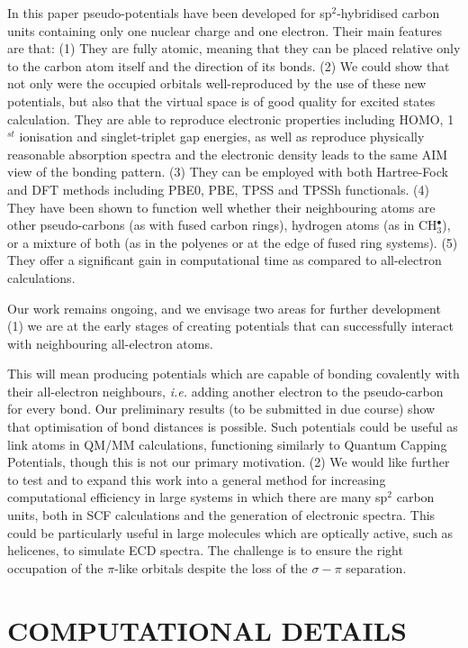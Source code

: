 \documentclass[12pt]{article}
\begin{document}
In this paper pseudo-potentials have been developed for sp$^{2}$-hybridised carbon units containing only one nuclear charge and one electron. 
Their main features are that: 
(1) They are fully atomic, meaning that they can be placed relative only to the carbon atom itself and the direction of its bonds. 
(2) We could show that not only were the occupied orbitals well-reproduced by the use of these new potentials, but also that the virtual space is of good quality for excited states calculation. 
They are able to reproduce electronic properties including HOMO, 1$^{st}$ ionisation and singlet-triplet gap energies, as well as reproduce physically reasonable absorption spectra and the electronic
density leads to the same AIM view of the bonding pattern.
(3) They can be employed with both Hartree-Fock and DFT methods including PBE0, PBE, TPSS and TPSSh functionals. 
(4) They have been shown to function well whether their neighbouring atoms are other pseudo-carbons (as with fused carbon rings), hydrogen atoms (as in CH\(^{\bullet}_{3}\)),
or a mixture of both (as in the polyenes or at the edge of fused ring systems). 
(5) They offer a significant gain in computational time as compared to all-electron calculations.

Our work remains ongoing, and we envisage two areas for further development
(1) we are at the early stages of creating potentials that can successfully interact with neighbouring all-electron atoms.

This will mean producing potentials which are capable of bonding covalently with their all-electron neighbours, \textsl{i.e.} adding another electron to the pseudo-carbon for every bond.
Our preliminary results (to be submitted in due course) show that optimisation of bond distances is possible.
Such potentials could be useful as link atoms in QM/MM calculations, functioning similarly to Quantum Capping Potentials,\cite{dilabio_simple_2002} though this is not our primary motivation.
(2) We would like further to test and to expand this work into a general method for increasing computational efficiency in large systems in
which there are many sp$^{2}$ carbon units, both in SCF calculations and the generation of electronic spectra.
This could be particularly useful in large molecules which are optically active, such as helicenes, to simulate ECD spectra.
The challenge is to ensure the right occupation of the $\pi$-like orbitals despite the loss of the
$\sigma-\pi$ separation.

\section*{\sffamily \large COMPUTATIONAL DETAILS}
\end{document}
